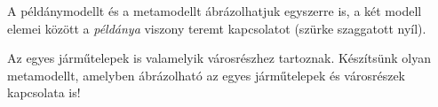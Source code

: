 
A példánymodellt és a metamodellt ábrázolhatjuk egyszerre is, a két modell elemei között a \emph{példánya} viszony teremt kapcsolatot (szürke szaggatott nyíl).



\begin{feladat}
	Az egyes járműtelepek is valamelyik városrészhez tartoznak. Készítsünk olyan metamodellt, amelyben ábrázolható az egyes járműtelepek és városrészek kapcsolata is!
\end{feladat}









